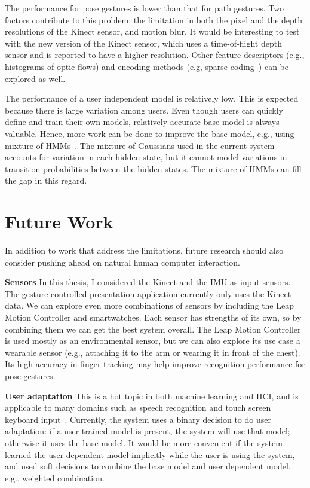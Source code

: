 The performance for pose gestures is lower than that
for path gestures. Two factors contribute to this problem: the limitation in
both the pixel and the depth resolutions of the Kinect sensor, and motion blur.
It would be interesting to test with the new version of the Kinect sensor, which
uses a time-of-flight depth sensor and is reported to have a higher resolution. Other feature descriptors
(e.g., histograms of optic flows) and encoding methods (e.g, sparse
coding~\cite{lee07}) can be explored as well.

The performance of a user independent model is relatively low. This is expected
because there is large variation among users. Even though users can
quickly define and train their own models, relatively accurate base
model is always valuable. Hence, more work can be done to improve the base
model, e.g., using mixture of HMMs~\cite{keskin12}. The mixture of Gaussians
used in the current system accounts for variation in each hidden state, but it
cannot model variations in transition probabilities between the hidden states.
The mixture of HMMs can fill the gap in this regard.

\section{Future Work}
In addition to work that address the limitations, future research should also
consider pushing ahead on natural human computer interaction.

\textbf{Sensors} In this thesis, I considered the Kinect and the IMU as
input sensors. The gesture controlled presentation application currently
only uses the Kinect data. We can explore even more combinations of sensors
by including the Leap Motion Controller and smartwatches. Each sensor has
strengths of its own, so by combining them we can get the best system
overall. The Leap Motion Controller is used mostly as an environmental sensor,
but we can also explore its use case a wearable sensor (e.g., attaching it to
the arm or wearing it in front of the chest).
Its high accuracy in finger tracking may help improve recognition performance for pose gestures.

\textbf{User adaptation} This is a hot topic in both machine learning and
HCI, and is applicable to many domains such as speech recognition and
touch screen keyboard input~\cite{yin13-making}. Currently, the system
uses a binary decision to do user adaptation: if a user-trained model is
present, the system will use that model; otherwise it uses the base
model. It would be more convenient if the system learned the user
dependent model implicitly while the user is using the system, and used
soft decisions to combine the base model and user dependent model, e.g.,
weighted combination.

